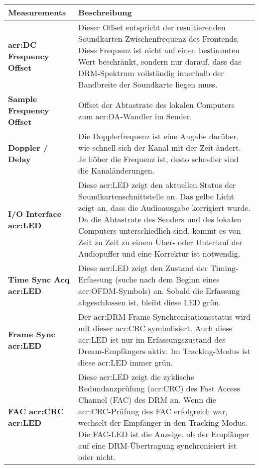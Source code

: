 \begin{table}[h]
	\begin{center}
		\begin{tabular}{p{0.28\linewidth}  p{0.72\linewidth}}	
			\toprule
			\textbf{Measurements} & \textbf{Beschreibung} \\
			\midrule
			\textbf{\gls{acr:DC} Frequency Offset} & Dieser Offset entspricht der resultierenden Soundkarten-Zwischenfrequenz des Frontends. Diese Frequenz ist nicht auf einen bestimmten Wert beschränkt, sondern nur darauf, dass das DRM-Spektrum vollständig innerhalb der Bandbreite der Soundkarte liegen muss.\\
			
			\textbf{Sample Frequency Offset} & Offset der Abtastrate des lokalen Computers zum \gls{acr:DA}-Wandler im Sender. \\
			
			\textbf{Doppler / Delay} & Die Dopplerfrequenz ist eine Angabe darüber, wie schnell sich der Kanal mit der Zeit ändert. Je höher die Frequenz ist, desto schneller sind die Kanaländerungen. \\
			
			\textbf{I/O Interface \gls{acr:LED}} & Diese \gls{acr:LED} zeigt den aktuellen Status der Soundkartenschnittstelle an. Das gelbe Licht zeigt an, dass die Audioausgabe korrigiert wurde. Da die Abtastrate des Senders und des lokalen Computers unterschiedlich sind, kommt es von Zeit zu Zeit zu einem Über- oder Unterlauf der Audiopuffer und eine Korrektur ist notwendig.\\
			
			\textbf{Time Sync Acq \gls{acr:LED}} &Diese \gls{acr:LED} zeigt den Zustand der Timing-Erfassung (suche nach dem Beginn eines \gls{acr:OFDM}-Symbols) an. Sobald die Erfassung abgeschlossen ist, bleibt diese LED grün.	\\
			
			\textbf{Frame Sync \gls{acr:LED}} & Der \gls{acr:DRM}-Frame-Synchronisationsstatus wird mit dieser \gls{acr:CRC} symbolisiert. Auch diese \gls{acr:LED} ist nur im Erfassungszustand des Dream-Empfängers aktiv. Im Tracking-Modus ist diese \gls{acr:LED} immer grün.\\
			
			\textbf{FAC \gls{acr:CRC} \gls{acr:LED}} & Diese \gls{acr:LED} zeigt die zyklische Redundanzprüfung (\gls{acr:CRC}) des Fast Access Channel (FAC) des DRM an. Wenn die \gls{acr:CRC}-Prüfung des FAC erfolgreich war, wechselt der Empfänger in den Tracking-Modus. Die FAC-LED ist die Anzeige, ob der Empfänger auf eine DRM-Übertragung synchronisiert ist oder nicht. \\
			

\end{tabular}
\end{center}
\end{table}
